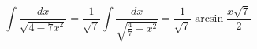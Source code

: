 \documentclass[../rgr1.tex]{subfiles}
\begin{document}
\Solution

\begin{equation}
	\int \frac{dx}{ \sqrt{4-7x^2} } =
	\frac{1}{\sqrt{7}} \int \frac{dx}{ \sqrt{ \frac{4}{7}-x^2} } =
	\frac{1}{\sqrt{7}} \arcsin\frac{ x\sqrt{7} }{2}
\end{equation}

\end{document}
